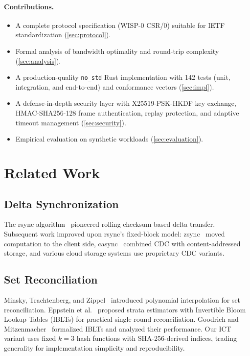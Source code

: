 \documentclass[11pt,twocolumn]{article}
\theoremstyle{definition}
\begin{document}
\paragraph{Contributions.}
\begin{itemize}
  \item A complete protocol specification (WISP-0 CSR/0) suitable for
    IETF standardization (\cref{sec:protocol}).
  \item Formal analysis of bandwidth optimality and round-trip complexity
    (\cref{sec:analysis}).
  \item A production-quality \texttt{no\_std} Rust implementation with
    142 tests (unit, integration, and end-to-end) and conformance vectors
    (\cref{sec:impl}).
  \item A defense-in-depth security layer with X25519-PSK-HKDF key
    exchange, HMAC-SHA256-128 frame authentication, replay protection,
    and adaptive timeout management (\cref{sec:security}).
  \item Empirical evaluation on synthetic workloads
    (\cref{sec:evaluation}).
\end{itemize}


\section{Related Work}
\label{sec:related}

\subsection{Delta Synchronization}

The rsync algorithm~\cite{rsync} pioneered rolling-checksum-based delta
transfer. Subsequent work improved upon rsync's fixed-block model:
zsync~\cite{zsync} moved computation to the client side,
casync~\cite{casync} combined CDC with content-addressed storage, and
various cloud storage systems use proprietary CDC variants.

\subsection{Set Reconciliation}

Minsky, Trachtenberg, and Zippel~\cite{mtz} introduced polynomial
interpolation for set reconciliation. Eppstein et al.~\cite{eppstein}
proposed strata estimators with Invertible Bloom Lookup Tables (IBLTs)
for practical single-round reconciliation. Goodrich and
Mitzenmacher~\cite{iblt} formalized IBLTs and analyzed their
performance. Our ICT variant uses fixed $k=3$ hash functions with
SHA-256-derived indices, trading generality for implementation
simplicity and reproducibility.
\end{document}
